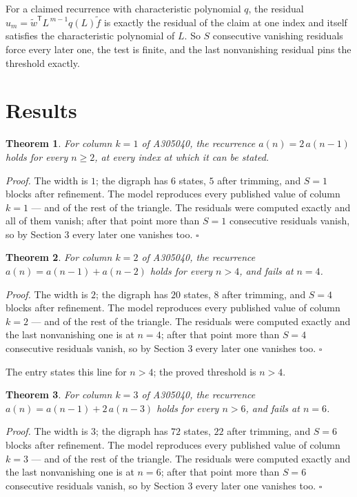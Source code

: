\documentclass[11pt]{article}
\newtheorem{theorem}{Theorem}
\theoremstyle{definition}
\begin{document}
For a claimed recurrence with characteristic polynomial $q$, the residual $u_m = \tilde w^{\mathsf T}L^{\,m-1}q(L)\tilde f$ is exactly the residual of the claim at one index and itself satisfies the characteristic polynomial of $L$. So $S$ consecutive vanishing residuals force every later one, the test is finite, and the last nonvanishing residual pins the threshold exactly.

\section{Results}

\begin{theorem} For column $k = 1$ of A305040, the recurrence $a(n) = 2\,a(n-1)$ holds for every $n \ge 2$, at every index at which it can be stated.\end{theorem}

{\itshape Proof.} The width is $1$; the digraph has $6$ states, $5$ after trimming, and $S = 1$ blocks after refinement. The model reproduces every published value of column $k = 1$ --- and of the rest of the triangle. The residuals were computed exactly and all of them vanish; after that point more than $S = 1$ consecutive residuals vanish, so by Section 3 every later one vanishes too. $\square$

\begin{theorem} For column $k = 2$ of A305040, the recurrence $a(n) = a(n-1) + a(n-2)$ holds for every $n > 4$, and fails at $n = 4$.\end{theorem}

{\itshape Proof.} The width is $2$; the digraph has $20$ states, $8$ after trimming, and $S = 4$ blocks after refinement. The model reproduces every published value of column $k = 2$ --- and of the rest of the triangle. The residuals were computed exactly and the last nonvanishing one is at $n = 4$; after that point more than $S = 4$ consecutive residuals vanish, so by Section 3 every later one vanishes too. $\square$

The entry states this line for $n > 4$; the proved threshold is $n > 4$.

\begin{theorem} For column $k = 3$ of A305040, the recurrence $a(n) = a(n-1) + 2\,a(n-3)$ holds for every $n > 6$, and fails at $n = 6$.\end{theorem}

{\itshape Proof.} The width is $3$; the digraph has $72$ states, $22$ after trimming, and $S = 6$ blocks after refinement. The model reproduces every published value of column $k = 3$ --- and of the rest of the triangle. The residuals were computed exactly and the last nonvanishing one is at $n = 6$; after that point more than $S = 6$ consecutive residuals vanish, so by Section 3 every later one vanishes too. $\square$
\end{document}

